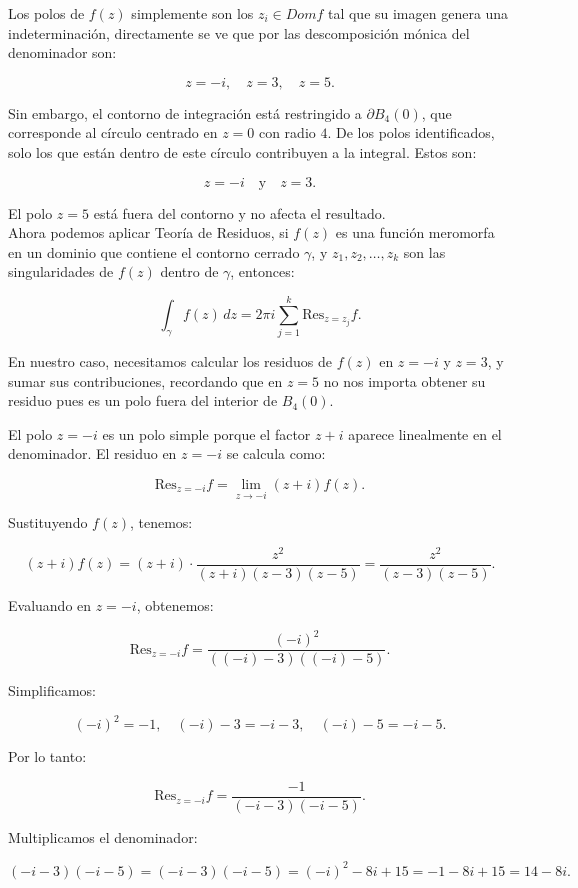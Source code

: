 \documentclass{article}
\begin{document}
Los polos de \(f(z)\) simplemente son los $z_i\in Domf$ tal que su imagen genera una indeterminación, directamente se ve que por las descomposición mónica del denominador son:

\[
z = -i, \quad z = 3, \quad z = 5.
\]

Sin embargo, el contorno de integración está restringido a \(\partial B_4(0)\), que corresponde al círculo centrado en \(z = 0\) con radio \(4\). De los polos identificados, solo los que están dentro de este círculo contribuyen a la integral. Estos son:

\[
z = -i \quad \text{y} \quad z = 3.
\]

El polo \(z = 5\) está fuera del contorno y no afecta el resultado. \\

Ahora podemos aplicar Teoría de Residuos, si \(f(z)\) es una función meromorfa en un dominio que contiene el contorno cerrado \(\gamma\), y \(z_1, z_2, \dots, z_k\) son las singularidades de \(f(z)\) dentro de \(\gamma\), entonces:

\[
\int_{\gamma} f(z) \, dz = 2\pi i \sum_{j=1}^k \text{Res}_{z = z_j} f.
\]

En nuestro caso, necesitamos calcular los residuos de \(f(z)\) en \(z = -i\) y \(z = 3\), y sumar sus contribuciones, recordando que en $z=5$ no nos importa obtener su residuo pues es un polo fuera del interior de $B_4(0)$.

El polo \(z = -i\) es un polo simple porque el factor \(z + i\) aparece linealmente en el denominador. El residuo en \(z = -i\) se calcula como:

\[
\text{Res}_{z = -i} f = \lim_{z \to -i} (z + i)f(z).
\]

Sustituyendo \(f(z)\), tenemos:

\[
(z + i)f(z) = (z + i) \cdot \frac{z^2}{(z + i)(z - 3)(z - 5)} = \frac{z^2}{(z - 3)(z - 5)}.
\]

Evaluando en \(z = -i\), obtenemos:

\[
\text{Res}_{z = -i} f = \frac{(-i)^2}{((-i) - 3)((-i) - 5)}.
\]

Simplificamos:

\[
(-i)^2 = -1, \quad (-i) - 3 = -i - 3, \quad (-i) - 5 = -i - 5.
\]

Por lo tanto:

\[
\text{Res}_{z = -i} f = \frac{-1}{(-i - 3)(-i - 5)}.
\]

Multiplicamos el denominador:

\[
(-i - 3)(-i - 5) = (-i - 3)(-i - 5) = (-i)^2 - 8i + 15 = -1 - 8i + 15 = 14 - 8i.
\]
\end{document}
